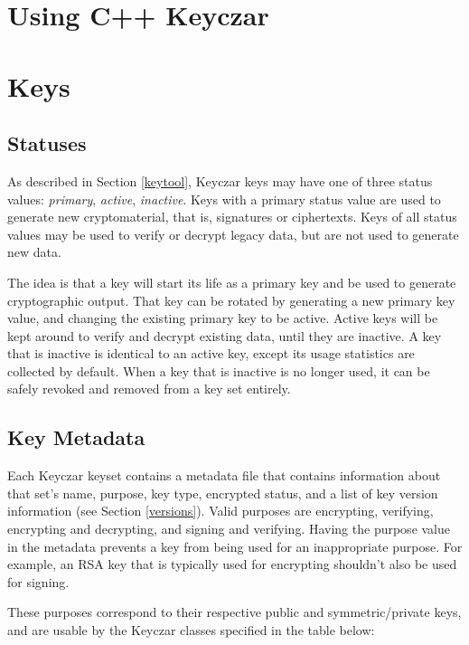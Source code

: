 \documentclass{llncs}
\begin{document}
\section{Using C++ Keyczar}

\section{Keys}

\subsection{Statuses}\label{status}

As described in Section \ref{keytool}, Keyczar keys may have one of three
status values: {\it primary}, {\it active}, {\it inactive}.
Keys with a primary status value are used to generate new cryptomaterial, that
is, signatures or ciphertexts. Keys of all status values may be used to verify
or decrypt legacy data, but are not used to generate new data.

The idea is that a key will start its life as a primary key and be used to
generate cryptographic output. That key can be rotated by generating a new
primary key value, and changing the existing primary key to be active. Active
keys will be kept around to verify and decrypt existing data, until they are
inactive. A key that is inactive is identical
to an active key, except its usage statistics are collected by default. When a
key that is inactive is no longer used, it can be safely
revoked and removed from a key set entirely.

\subsection{Key Metadata}\label{metadata}

Each Keyczar keyset contains a metadata file that contains information about
that set's name, purpose, key type, encrypted status, and a list of key version
information (see Section \ref{versions}). Valid purposes are encrypting,
verifying, encrypting and decrypting, and signing and verifying. Having the
purpose value in the metadata prevents a key from being used for an
inappropriate purpose. For example, an RSA key that is typically used for
encrypting shouldn't also be used for signing.

These purposes correspond to their respective public and symmetric/private
keys, and are usable by the Keyczar classes specified in the table below:
\end{document}
